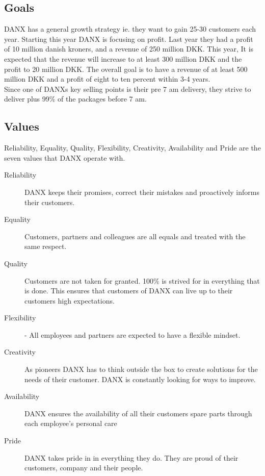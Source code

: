 \subsection{Goals}
DANX has a general growth strategy ie. they want to gain 25-30 customers each year. Starting this year DANX is focusing on profit. Last year they had a profit of 10 million danish kroners, and a revenue of 250 million DKK. This year, It is expected that the revenue will increase to at least 300 million DKK and the profit to 20 million DKK. The overall goal is to have a revenue of at least 500 million DKK and a profit of eight to ten percent within 3-4 years. \\

Since one of DANXs key selling points is their pre 7 am delivery, they strive to deliver plus 99\% of the packages before 7 am.

\subsection{Values}
Reliability, Equality, Quality, Flexibility, Creativity, Availability and Pride are the seven values that DANX operate with.

\begin{description}

\item[Reliability] DANX keeps their promises, correct their mistakes and proactively informs their customers.
\item[Equality] Customers, partners and colleagues are all equals and treated with the same respect.
\item[Quality] Customers are not taken for granted. 100\% is strived for in everything that is done. This ensures that customers of DANX can live up to their customers high expectations.
\item[Flexibility] - All employees and partners are expected to have a flexible mindset.
\item[Creativity] As pioneers DANX has to think outside the box to create solutions for the needs of their customer. DANX is constantly looking for ways to improve.
\item[Availability] DANX ensures the availability of all their customers spare parts through each employee’s personal care
\item[Pride] DANX takes pride in in everything they do. They are proud of their customers, company and their people.

\end{description}

